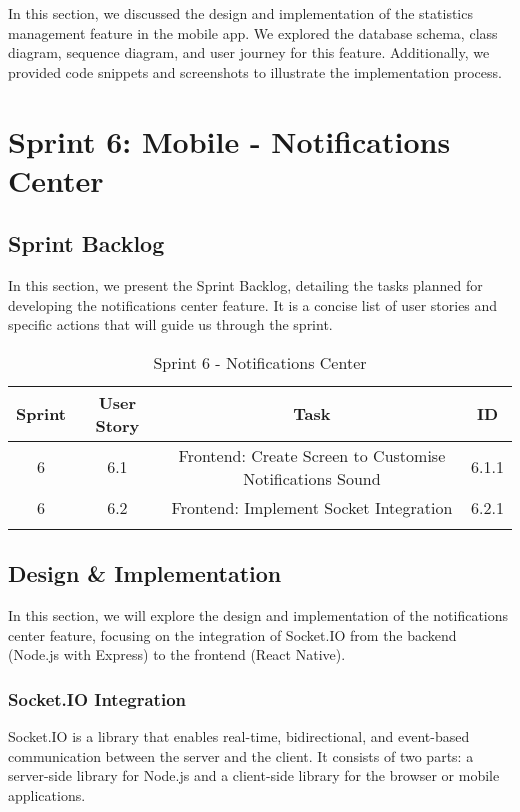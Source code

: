 In this section, we discussed the design and implementation of the statistics management feature in the mobile app. We explored the database schema, class diagram, sequence diagram, and user journey for this feature. Additionally, we provided code snippets and screenshots to illustrate the implementation process.

\section{Sprint 6: Mobile - Notifications Center}

\subsection{Sprint Backlog}

In this section, we present the Sprint Backlog, detailing the tasks planned for developing the notifications center feature. It is a concise list of user stories and specific actions that will guide us through the sprint.

\setlength{\LTleft}{0pt}
\begin{longtable}{|c|c|c|c|}
\hline
\textbf{Sprint} & \textbf{User Story} & \textbf{Task} & \textbf{ID} \\
\hline
6 & 6.1 & Frontend: Create Screen to Customise Notifications Sound & 6.1.1 \\
\hline
6 & 6.2 & Frontend: Implement Socket Integration & 6.2.1 \\
\hline
\caption{Sprint 6 - Notifications Center}
\label{tab:sprint6_backlog}
\end{longtable}

\subsection{Design \& Implementation}

In this section, we will explore the design and implementation of the notifications center feature, focusing on the integration of Socket.IO from the backend (Node.js with Express) to the frontend (React Native).

\subsubsection{Socket.IO Integration}

Socket.IO is a library that enables real-time, bidirectional, and event-based communication between the server and the client. It consists of two parts: a server-side library for Node.js and a client-side library for the browser or mobile applications.

